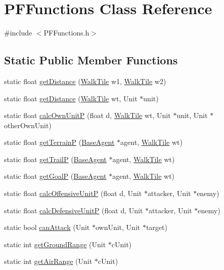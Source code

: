 \hypertarget{class_p_f_functions}{\section{P\-F\-Functions Class Reference}
\label{class_p_f_functions}
}


{\ttfamily \#include $<$P\-F\-Functions.\-h$>$}

\subsection*{Static Public Member Functions}
\begin{DoxyCompactItemize}
\item 
static float \hyperlink{class_p_f_functions_a0a90a19eb00cc96f8c737e1a0314f75c}{get\-Distance} (\hyperlink{class_walk_tile}{Walk\-Tile} w1, \hyperlink{class_walk_tile}{Walk\-Tile} w2)
\item 
static float \hyperlink{class_p_f_functions_aacb222bd1f136a81aca2171661fd08e3}{get\-Distance} (\hyperlink{class_walk_tile}{Walk\-Tile} wt, Unit $\ast$unit)
\item 
static float \hyperlink{class_p_f_functions_a5585eeb7efe6293f75b9004caedde8c5}{calc\-Own\-Unit\-P} (float d, \hyperlink{class_walk_tile}{Walk\-Tile} wt, Unit $\ast$unit, Unit $\ast$other\-Own\-Unit)
\item 
static float \hyperlink{class_p_f_functions_ab1d5636addb01e14630ed0fd87cfa61d}{get\-Terrain\-P} (\hyperlink{class_base_agent}{Base\-Agent} $\ast$agent, \hyperlink{class_walk_tile}{Walk\-Tile} wt)
\item 
static float \hyperlink{class_p_f_functions_ae8f94f088e13dd9f779ae32a3ed06eba}{get\-Trail\-P} (\hyperlink{class_base_agent}{Base\-Agent} $\ast$agent, \hyperlink{class_walk_tile}{Walk\-Tile} wt)
\item 
static float \hyperlink{class_p_f_functions_ab2e0d31745367caf526695cade9b1d65}{get\-Goal\-P} (\hyperlink{class_base_agent}{Base\-Agent} $\ast$agent, \hyperlink{class_walk_tile}{Walk\-Tile} wt)
\item 
static float \hyperlink{class_p_f_functions_aabf49cb5594583d30957044272c82db9}{calc\-Offensive\-Unit\-P} (float d, Unit $\ast$attacker, Unit $\ast$enemy)
\item 
static float \hyperlink{class_p_f_functions_a97417b07f22b9c78700ec88c8a830fec}{calc\-Defensive\-Unit\-P} (float d, Unit $\ast$attacker, Unit $\ast$enemy)
\item 
static bool \hyperlink{class_p_f_functions_a77694897738c2348d03405db3a47e553}{can\-Attack} (Unit $\ast$own\-Unit, Unit $\ast$target)
\item 
static int \hyperlink{class_p_f_functions_ad3467051e480199fb3589adcb21c0494}{get\-Ground\-Range} (Unit $\ast$c\-Unit)
\item 
static int \hyperlink{class_p_f_functions_a5d3a54f1510e69050ea1e474f13af749}{get\-Air\-Range} (Unit $\ast$c\-Unit)
\end{DoxyCompactItemize}


